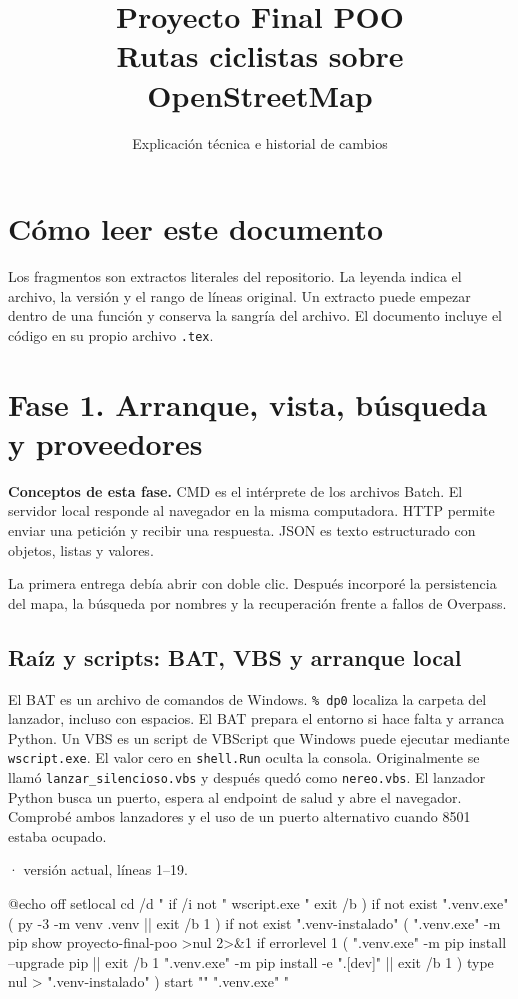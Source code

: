 \documentclass[11pt,a4paper]{article}
\title{Proyecto Final POO\\Rutas ciclistas sobre OpenStreetMap}
\author{Explicación técnica e historial de cambios}
\date{}
\begin{document}
\maketitle
\tableofcontents
\clearpage

\section*{Cómo leer este documento}
Los fragmentos son extractos literales del repositorio. La leyenda indica
el archivo, la versión y el rango de líneas original. Un extracto puede
empezar dentro de una función y conserva la sangría del archivo. El documento
incluye el código en su propio archivo \texttt{.tex}.

\section{Fase 1. Arranque, vista, búsqueda y proveedores}

\textbf{Conceptos de esta fase.} CMD es el intérprete de los archivos Batch. El servidor local responde al navegador en la misma computadora. HTTP permite enviar una petición y recibir una respuesta. JSON es texto estructurado con objetos, listas y valores.

La primera entrega debía abrir con doble clic. Después incorporé la persistencia del mapa, la búsqueda por nombres y la recuperación frente a fallos de Overpass.

\subsection{Raíz y scripts: BAT, VBS y arranque local}
El BAT es un archivo de comandos de Windows. \texttt{\%\string~dp0} localiza la carpeta del lanzador, incluso con espacios. El BAT prepara el entorno si hace falta y arranca Python. Un VBS es un script de VBScript que Windows puede ejecutar mediante \texttt{wscript.exe}. El valor cero en \texttt{shell.Run} oculta la consola. Originalmente se llamó \texttt{lanzar\_silencioso.vbs} y después quedó como \texttt{nereo.vbs}. El lanzador Python busca un puerto, espera al endpoint de salud y abre el navegador. Comprobé ambos lanzadores y el uso de un puerto alternativo cuando 8501 estaba ocupado.

\smallskip
{\footnotesize\texttt{} · versión actual, líneas 1--19.}\par
\begin{Codigo}[firstnumber=1]
@echo off
setlocal
cd /d "%
if /i not "%
    wscript.exe "%
    exit /b
)
if not exist ".venv\Scripts\pythonw.exe" (
    py -3 -m venv .venv || exit /b 1
)
if not exist ".venv\rutas-instalado" (
    ".venv\Scripts\python.exe" -m pip show proyecto-final-poo >nul 2>&1
    if errorlevel 1 (
        ".venv\Scripts\python.exe" -m pip install --upgrade pip || exit /b 1
        ".venv\Scripts\python.exe" -m pip install -e ".[dev]" || exit /b 1
    )
    type nul > ".venv\rutas-instalado"
)
start "" ".venv\Scripts\pythonw.exe" "%
\end{Codigo}
\end{document}
